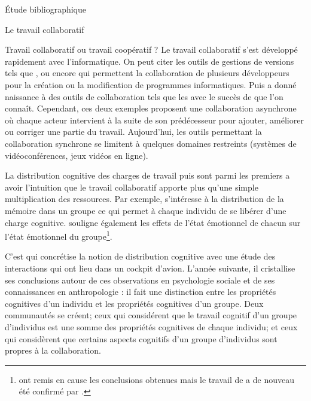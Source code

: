 \documentclass[myfrancais,ngerman,english,frenchb]{mythesis}
\begin{document}
\begin{mychapter}{Étude bibliographique}
\begin{mysection}{Le travail collaboratif}
\begin{mysubsection}{Travail collaboratif ou travail coopératif ?}
				Le travail collaboratif s'est développé rapidement avec l'informatique.
				On peut citer les outils de gestions de versions tels que ,  ou encore  qui permettent la collaboration de plusieurs développeurs pour la création ou la modification de programmes informatiques.
				Puis \myInternet a donné naissance à des outils de collaboration tels que les \myWiki* {} avec le succès de \myWikipedia que l'on connaît.
				Cependant, ces deux exemples proposent une collaboration asynchrone où chaque acteur intervient à la suite de son prédécesseur pour ajouter, améliorer ou corriger une partie du travail.
				Aujourd'hui, les outils permettant la collaboration synchrone se limitent à quelques domaines restreints (systèmes de vidéoconférences, jeux vidéos en ligne).
			\end{mysubsection}
			\begin{mysubsection}{La distribution cognitive des charges de travail}
				 puis  sont parmi les premiers a avoir l'intuition que le travail collaboratif apporte plus qu'une simple multiplication des ressources.
				Par exemple,  s'intéresse à la distribution de la mémoire dans un groupe ce qui permet à chaque individu de se libérer d'une charge cognitive.
				 souligne également les effets de l'état émotionnel de chacun sur l'état émotionnel du groupe\footnote{ ont remis en cause les conclusions obtenues mais le travail de  a de nouveau été confirmé par .}.

				C'est  qui concrétise la notion de distribution cognitive avec une étude des interactions qui ont lieu dans un cockpit d'avion.
				L'année suivante, il cristallise ses conclusions autour de ces observations en psychologie sociale et de ses connaissances en anthropologie  : il fait une distinction entre les propriétés cognitives d'un individu et les propriétés cognitives d'un groupe.
				Deux communautés se créent; ceux qui considérent que le travail cognitif d'un groupe d'individus est une somme des propriétés cognitives de chaque individu; et ceux qui considèrent que certains aspects cognitifs d'un groupe d'individus sont propres à la collaboration.


\end{mysubsection}
\end{mysection}
\end{mychapter}
\end{document}
